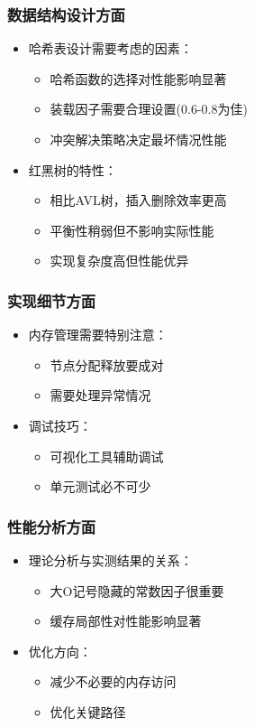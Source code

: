 \documentclass[12pt,a4paper]{article}
\begin{document}
\subsubsection{数据结构设计方面}
\begin{itemize}
\item 哈希表设计需要考虑的因素：
  \begin{itemize}
  \item 哈希函数的选择对性能影响显著
  \item 装载因子需要合理设置(0.6-0.8为佳)
  \item 冲突解决策略决定最坏情况性能
  \end{itemize}
\item 红黑树的特性：
  \begin{itemize}
  \item 相比AVL树，插入删除效率更高
  \item 平衡性稍弱但不影响实际性能
  \item 实现复杂度高但性能优异
  \end{itemize}
\end{itemize}

\subsubsection{实现细节方面}
\begin{itemize}
\item 内存管理需要特别注意：
  \begin{itemize}
  \item 节点分配释放要成对
  \item 需要处理异常情况
  \end{itemize}
\item 调试技巧：
  \begin{itemize}
  \item 可视化工具辅助调试
  \item 单元测试必不可少
  \end{itemize}
\end{itemize}

\subsubsection{性能分析方面}
\begin{itemize}
\item 理论分析与实测结果的关系：
  \begin{itemize}
  \item 大O记号隐藏的常数因子很重要
  \item 缓存局部性对性能影响显著
  \end{itemize}
\item 优化方向：
  \begin{itemize}
  \item 减少不必要的内存访问
  \item 优化关键路径
  \end{itemize}
\end{itemize}
\end{document}

